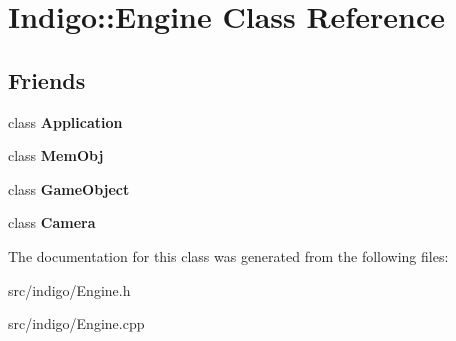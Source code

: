 \hypertarget{class_indigo_1_1_engine}{}\section{Indigo\+:\+:Engine Class Reference}
\label{class_indigo_1_1_engine}
\subsection*{Friends}
\begin{DoxyCompactItemize}
\item 
\mbox{\label{class_indigo_1_1_engine_a23f25bcc02a0e94c2f5a4188496b04d0}} 
class {\bfseries Application}
\item 
\mbox{\label{class_indigo_1_1_engine_a5b789837fad8c88af8443fc6aa839c75}} 
class {\bfseries Mem\+Obj}
\item 
\mbox{\label{class_indigo_1_1_engine_a00df87c957d8f7ee0fc51f07a0542f4a}} 
class {\bfseries Game\+Object}
\item 
\mbox{\label{class_indigo_1_1_engine_ad8bd9afbbd7af19d996da80e9d25890d}} 
class {\bfseries Camera}
\end{DoxyCompactItemize}


The documentation for this class was generated from the following files\+:\begin{DoxyCompactItemize}
\item 
src/indigo/Engine.\+h\item 
src/indigo/Engine.\+cpp\end{DoxyCompactItemize}
